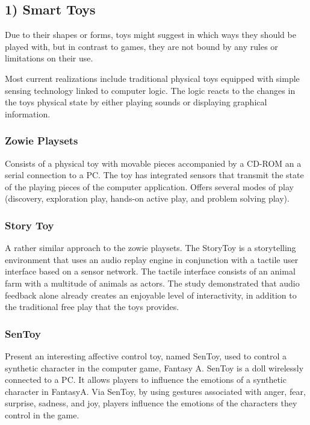     \subsection*{1) Smart Toys}

    Due to their shapes or forms, toys might suggest in which ways they should be played with, but in contrast to games, they are not bound by any rules or limitations on their use. 

    Most current realizations include traditional physical toys equipped with simple sensing technology linked to computer logic. The logic reacts to the changes in the toys physical state by either playing sounds or displaying graphical information. 

      \subsubsection*{Zowie Playsets}
      Consists of a physical toy with movable pieces accompanied by a CD-ROM an a serial connection to a PC. The toy has integrated sensors that transmit the state of the playing pieces of the computer application. Offers several modes of play (discovery, exploration play, hands-on active play, and problem solving play).

      \subsubsection*{Story Toy}
      A rather similar approach to the zowie playsets. The StoryToy is a storytelling environment that uses an audio replay engine in conjunction with a tactile user interface based on a sensor network. The tactile interface consists of an animal farm with a multitude of animals as actors. The study demonstrated that audio feedback alone already creates an enjoyable level of interactivity, in addition to the traditional free play that the toys provides. 

      \subsubsection*{SenToy}
      Present an interesting affective control toy, named SenToy, used to control a synthetic character in the computer game, Fantasy A. SenToy is a doll wirelessly connected to a PC. It allows players to influence the emotions of a synthetic character in FantasyA. Via SenToy, by using gestures associated with anger, fear, surprise, sadness, and joy, players influence the emotions of the characters they control in the game. 

